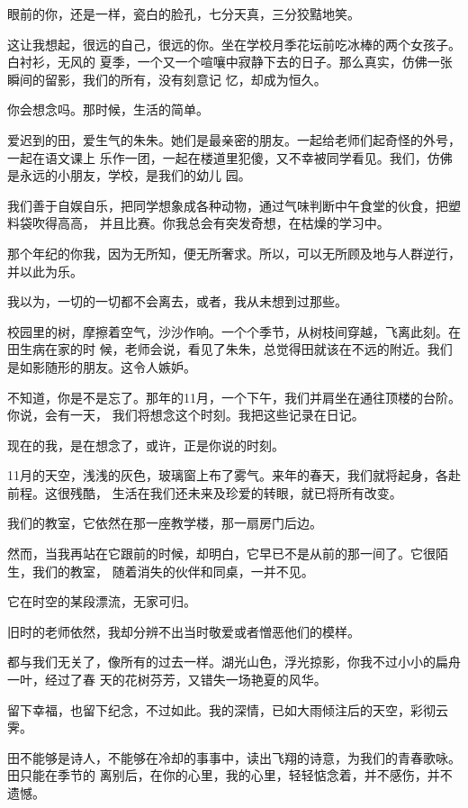 	\endwriting



		眼前的你，还是一样，瓷白的脸孔，七分天真，三分狡黠地笑。

		这让我想起，很远的自己，很远的你。坐在学校月季花坛前吃冰棒的两个女孩子。白衬衫，无风的
	夏季，一个又一个喧嚷中寂静下去的日子。那么真实，仿佛一张瞬间的留影，我们的所有，没有刻意记
	忆，却成为恒久。


		你会想念吗。那时候，生活的简单。

		爱迟到的田，爱生气的朱朱。她们是最亲密的朋友。一起给老师们起奇怪的外号，一起在语文课上
	乐作一团，一起在楼道里犯傻，又不幸被同学看见。我们，仿佛是永远的小朋友，学校，是我们的幼儿
	园。

		我们善于自娱自乐，把同学想象成各种动物，通过气味判断中午食堂的伙食，把塑料袋吹得高高，
	并且比赛。你我总会有突发奇想，在枯燥的学习中。


		那个年纪的你我，因为无所知，便无所奢求。所以，可以无所顾及地与人群逆行，并以此为乐。

		我以为，一切的一切都不会离去，或者，我从未想到过那些。


		校园里的树，摩擦着空气，沙沙作响。一个个季节，从树枝间穿越，飞离此刻。在田生病在家的时
	候，老师会说，看见了朱朱，总觉得田就该在不远的附近。我们是如影随形的朋友。这令人嫉妒。

		不知道，你是不是忘了。那年的11月，一个下午，我们并肩坐在通往顶楼的台阶。你说，会有一天，
	我们将想念这个时刻。我把这些记录在日记。


		现在的我，是在想念了，或许，正是你说的时刻。

		11月的天空，浅浅的灰色，玻璃窗上布了雾气。来年的春天，我们就将起身，各赴前程。这很残酷，
	生活在我们还未来及珍爱的转眼，就已将所有改变。


		我们的教室，它依然在那一座教学楼，那一扇房门后边。

		然而，当我再站在它跟前的时候，却明白，它早已不是从前的那一间了。它很陌生，我们的教室，
	随着消失的伙伴和同桌，一并不见。

		它在时空的某段漂流，无家可归。

		旧时的老师依然，我却分辨不出当时敬爱或者憎恶他们的模样。


		都与我们无关了，像所有的过去一样。湖光山色，浮光掠影，你我不过小小的扁舟一叶，经过了春
	天的花树芬芳，又错失一场艳夏的风华。


		留下幸福，也留下纪念，不过如此。我的深情，已如大雨倾注后的天空，彩彻云霁。

		田不能够是诗人，不能够在冷却的事事中，读出飞翔的诗意，为我们的青春歌咏。田只能在季节的
	离别后，在你的心里，我的心里，轻轻惦念着，并不感伤，并不遗憾。

